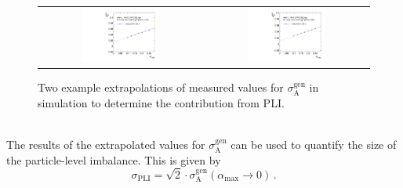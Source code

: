 \begin{figure}[!tp]
  \centering
  \begin{tabular}{cc}
                \includegraphics[width=0.49\textwidth]{figures/Extrapol_Eta0_pt4_gen_final_nominal_v4b.pdf} &
                \includegraphics[width=0.49\textwidth]{figures/Extrapol_Eta0_pt9_gen_final_nominal_v4b.pdf}
  \end{tabular}
  \caption{Two example extrapolations of measured values for $\sigma^\mathrm{gen}_\mathrm{A}$ in simulation to determine the contribution from PLI.}
  \label{fig:extrapol_gen}
\end{figure}
\\
The results of the extrapolated values for $\sigma^\mathrm{gen}_\mathrm{A}$ can be used to quantify the size of the particle-level imbalance. This is given by
 \begin{equation}
 \label{eq:pli}
 \sigma_\mathrm{PLI} = \sqrt{2} \cdot \sigma^\mathrm{gen}_\mathrm{A}(\alpha_\mathrm{max} \rightarrow 0) \, .
 \end{equation}

